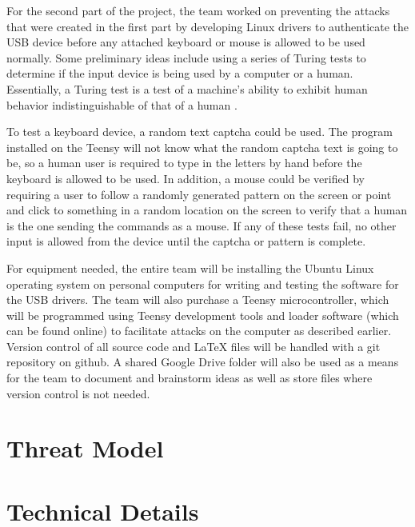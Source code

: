 \documentclass[pagenumbers]{ieee}
\begin{document}
For the second part of the project, the team worked on preventing the attacks that were created in the first part by developing Linux drivers to authenticate the USB device before any attached keyboard or mouse is allowed to be used normally. Some preliminary ideas include using a series of Turing tests to determine if the input device is being used by a computer or a human. Essentially, a Turing test is a test of a machine's ability to exhibit human behavior indistinguishable of that of a human \cite{wiki}.

To test a keyboard device, a random text captcha could be used. The program installed on the Teensy will not know what the random captcha text is going to be, so a human user is required to type in the letters by hand before the keyboard is allowed to be used. In addition, a mouse could be verified by requiring a user to follow a randomly generated pattern on the screen or point and click to something in a random location on the screen to verify that a human is the one sending the commands as a mouse. If any of these tests fail, no other input is allowed from the device until the captcha or pattern is complete.

For equipment needed, the entire team will be installing the Ubuntu Linux operating system on personal computers for writing and testing the software for the USB drivers. The team will also purchase a Teensy microcontroller, which will be programmed using Teensy development tools and loader software (which can be found online) to facilitate attacks on the computer as described earlier. Version control of all source code and LaTeX files will be handled with a git repository on github. A shared Google Drive folder will also be used as a means for the team to document and brainstorm ideas as well as store files where version control is not needed.


\section{Threat Model}


\section{Technical Details}

\end{document}
